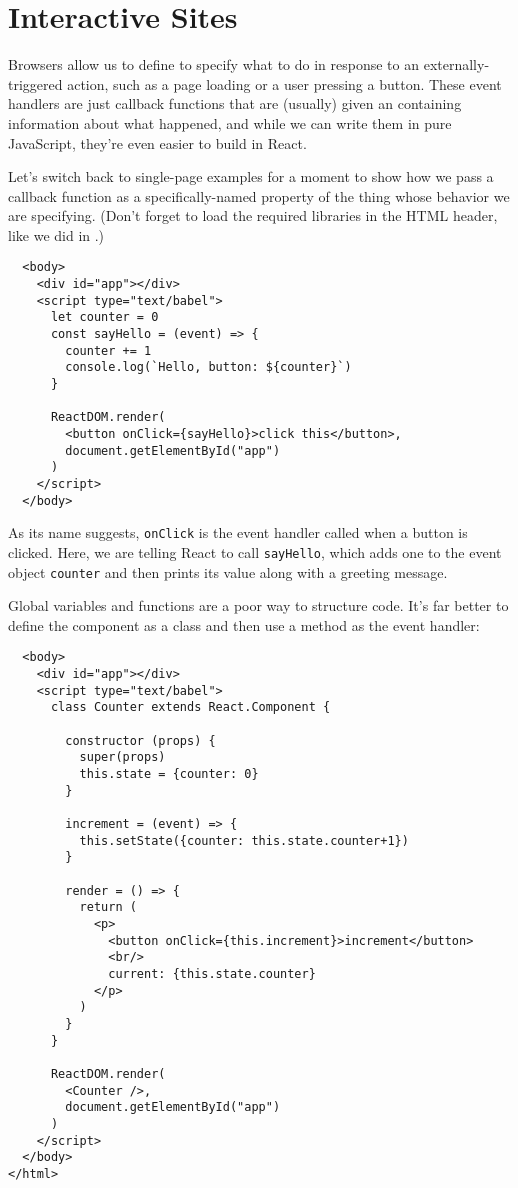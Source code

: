 \chapter{Interactive Sites}\label{s:interactive}

Browsers allow us to define 
to specify what to do in response to an externally-triggered action,
such as a page loading or a user pressing a button.
These event handlers are just callback functions
that are (usually) given an 
containing information about what happened,
and while we can write them in pure JavaScript,
they're even easier to build in React.

Let's switch back to single-page examples for a moment
to show how we pass a callback function as
a specifically-named property of the thing whose behavior we are specifying.
(Don't forget to load the required libraries in the HTML header, like we did
in .)

\begin{verbatim}
  <body>
    <div id="app"></div>
    <script type="text/babel">
      let counter = 0
      const sayHello = (event) => {
        counter += 1
        console.log(`Hello, button: ${counter}`)
      }

      ReactDOM.render(
        <button onClick={sayHello}>click this</button>,
        document.getElementById("app")
      )
    </script>
  </body>
\end{verbatim}

As its name suggests,
\texttt{onClick} is the event handler called when a button is clicked.
Here,
we are telling React to call \texttt{sayHello},
which adds one to the event object \texttt{counter}
and then prints its value along with a greeting message.

Global variables and functions are a poor way to structure code.
It's far better to define the component as a class
and then use a method as the event handler:

\begin{verbatim}
  <body>
    <div id="app"></div>
    <script type="text/babel">
      class Counter extends React.Component {

        constructor (props) {
          super(props)
          this.state = {counter: 0}
        }

        increment = (event) => {
          this.setState({counter: this.state.counter+1})
        }

        render = () => {
          return (
            <p>
              <button onClick={this.increment}>increment</button>
              <br/>
              current: {this.state.counter}
            </p>
          )
        }
      }

      ReactDOM.render(
        <Counter />,
        document.getElementById("app")
      )
    </script>
  </body>
</html>
\end{verbatim}

